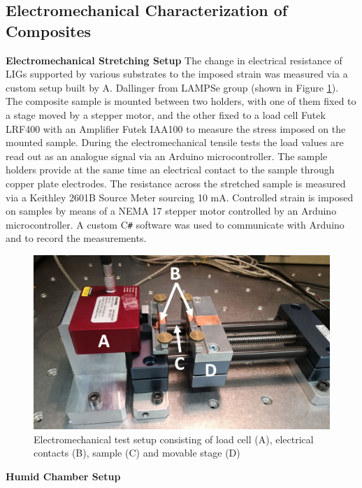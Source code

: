 \subsection{Electromechanical Characterization of Composites}

\medskip
\textbf{Electromechanical Stretching Setup}
The change in electrical resistance of LIGs supported by various substrates to the imposed strain was measured via a custom setup built by A. Dallinger from LAMPSe group (shown in Figure \ref{fig:stretcher}). The composite sample is mounted between two holders, with one of them fixed to a stage moved by a stepper motor, and the other fixed to a load cell Futek LRF400 with an Ampliﬁer Futek IAA100 to measure the stress imposed on the mounted sample.  During the electromechanical tensile tests the load values are read out as an analogue signal via an Arduino microcontroller. The sample holders provide at the same time an electrical contact to the sample through copper plate electrodes.  The resistance across the stretched sample is measured via a Keithley 2601B Source Meter sourcing 10 mA. Controlled strain is imposed on samples by means of a NEMA 17 stepper motor controlled by an Arduino microcontroller. A custom C\texttt{\#} software was used to communicate with Arduino and to record the measurements. 

\begin{figure}[H]
\centering
\includegraphics[width=1\textwidth]{Figures/ExperimentalSetup/Stretcher.jpg}
\medskip
\caption{Electromechanical test setup consisting of load cell (A), electrical contacts (B), sample (C) and movable stage (D) \cite{Dallinger}
}
\label{fig:stretcher}
\end{figure}

\medskip
\textbf{Humid Chamber Setup}

